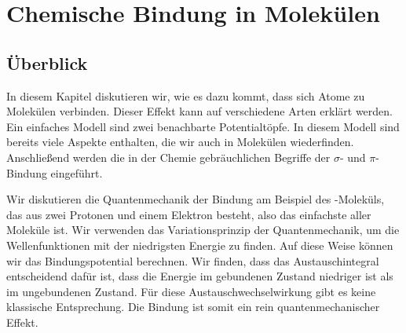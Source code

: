 \renewcommand{\lastmod}{10. Dezember 2024} 
\renewcommand{\chapterauthors}{Markus Lippitz}

\chapter{Chemische Bindung in Molekülen}












\section{Überblick}

In diesem Kapitel diskutieren wir, wie es dazu kommt, dass sich Atome zu Molekülen verbinden. Dieser Effekt kann auf verschiedene Arten erklärt werden. Ein einfaches Modell sind zwei benachbarte Potentialtöpfe. In diesem Modell sind bereits viele Aspekte enthalten, die wir auch in Molekülen wiederfinden. Anschließend werden die in der Chemie gebräuchlichen Begriffe der $\sigma$- und $\pi$-Bindung eingeführt.
 
Wir diskutieren die Quantenmechanik der Bindung am Beispiel des -Moleküls, das aus zwei Protonen und einem Elektron besteht, also das einfachste aller Moleküle ist. Wir verwenden das Variationsprinzip der Quantenmechanik, um die Wellenfunktionen mit der niedrigsten Energie zu finden. Auf diese Weise können wir das Bindungspotential berechnen. Wir finden, dass das Austauschintegral entscheidend dafür ist, dass die Energie im gebundenen Zustand niedriger ist als im ungebundenen Zustand. Für diese Austauschwechselwirkung gibt es keine klassische Entsprechung. Die Bindung ist somit ein rein quantenmechanischer Effekt.

